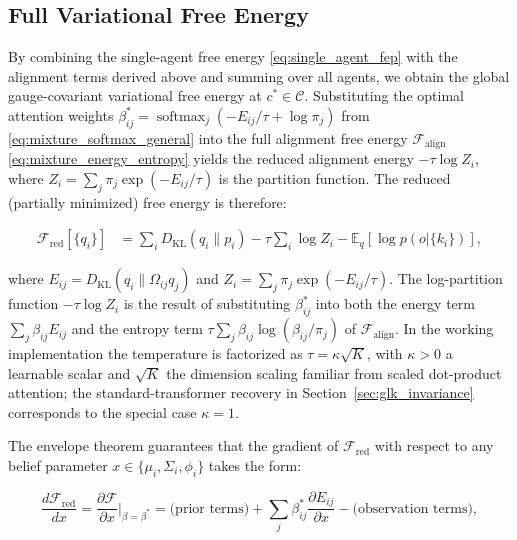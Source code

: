 \documentclass[twoside,11pt]{article}
\newcommand{\softmax}{\operatorname{softmax}}
\begin{document}
\subsection{Full Variational Free Energy}
\label{sec:final_free_energy}

By combining the single-agent free energy \eqref{eq:single_agent_fep} with the alignment terms derived above and summing over all agents, we obtain the global gauge-covariant variational free energy at $c^* \in \mathcal{C}$. Substituting the optimal attention weights $\beta_{ij}^* = \softmax_j(-E_{ij}/\tau + \log\pi_j)$ from \eqref{eq:mixture_softmax_general} into the full alignment free energy $\mathcal{F}_{\text{align}}$ \eqref{eq:mixture_energy_entropy} yields the reduced alignment energy $-\tau\log Z_i$, where $Z_i = \sum_j \pi_j\exp(-E_{ij}/\tau)$ is the partition function. The reduced (partially minimized) free energy is therefore:

\begin{equation}
\boxed{
\begin{aligned}
\mathcal{F}_{\mathrm{red}}[\{q_i\}]
&=\sum_i D_{\mathrm{KL}}(q_i \| p_i)
-\tau\sum_i \log Z_i
-\mathbb{E}_q[\log p(o |\{k_i\})],
\end{aligned}
}
\label{eq:free_energy_final}
\end{equation}

where $E_{ij} = D_{\mathrm{KL}}(q_i \| \Omega_{ij} q_j)$ and $Z_i = \sum_j \pi_j \exp(-E_{ij}/\tau)$. The log-partition function $-\tau\log Z_i$ is the result of substituting $\beta_{ij}^*$ into both the energy term $\sum_j \beta_{ij} E_{ij}$ and the entropy term $\tau\sum_j \beta_{ij}\log(\beta_{ij}/\pi_j)$ of $\mathcal{F}_{\text{align}}$. In the working implementation the temperature is factorized as $\tau = \kappa\sqrt{K}$, with $\kappa > 0$ a learnable scalar and $\sqrt{K}$ the dimension scaling familiar from scaled dot-product attention; the standard-transformer recovery in Section~\ref{sec:glk_invariance} corresponds to the special case $\kappa = 1$.

The envelope theorem guarantees that the gradient of $\mathcal{F}_{\mathrm{red}}$ with respect to any belief parameter $x \in \{\mu_i, \Sigma_i, \phi_i\}$ takes the form:

\begin{equation}
\frac{d\mathcal{F}_{\mathrm{red}}}{dx} = \frac{\partial\mathcal{F}}{\partial x}\bigg|_{\beta=\beta^*}
= \text{(prior terms)} + \sum_j \beta_{ij}^* \frac{\partial E_{ij}}{\partial x} - \text{(observation terms)},
\label{eq:envelope_form}
\end{equation}
\end{document}
